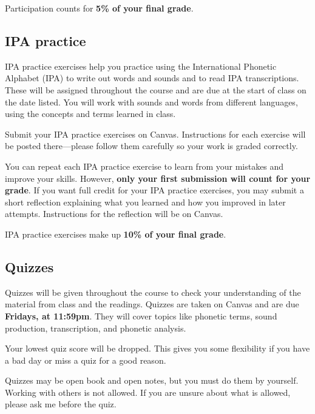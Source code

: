 \documentclass[12pt, letterpaper]{article}
\begin{document}
Participation counts for \textbf{5\% of your final grade}.

\subsection*{IPA practice} \label{sec:transcription_exercises}

IPA practice exercises help you practice using the International Phonetic Alphabet (IPA) to write out words and sounds and to read IPA transcriptions. These will be assigned throughout the course and are due at the start of class on the date listed. You will work with sounds and words from different languages, using the concepts and terms learned in class.

Submit your IPA practice exercises on Canvas. Instructions for each exercise will be posted there—please follow them carefully so your work is graded correctly.

You can repeat each IPA practice exercise to learn from your mistakes and improve your skills. However, \textbf{only your first submission will count for your grade}. If you want full credit for your IPA practice exercises, you may submit a short reflection explaining what you learned and how you improved in later attempts. Instructions for the reflection will be on Canvas.

IPA practice exercises make up \textbf{10\% of your final grade}.

\subsection*{Quizzes} \label{sec:quizzes}

Quizzes will be given throughout the course to check your understanding of the material from class and the readings. Quizzes are taken on Canvas and are due \textbf{Fridays, at 11:59pm}. They will cover topics like phonetic terms, sound production, transcription, and phonetic analysis.

Your lowest quiz score will be dropped. This gives you some flexibility if you have a bad day or miss a quiz for a good reason.

Quizzes may be open book and open notes, but you must do them by yourself. Working with others is not allowed. If you are unsure about what is allowed, please ask me before the quiz.
\end{document}
